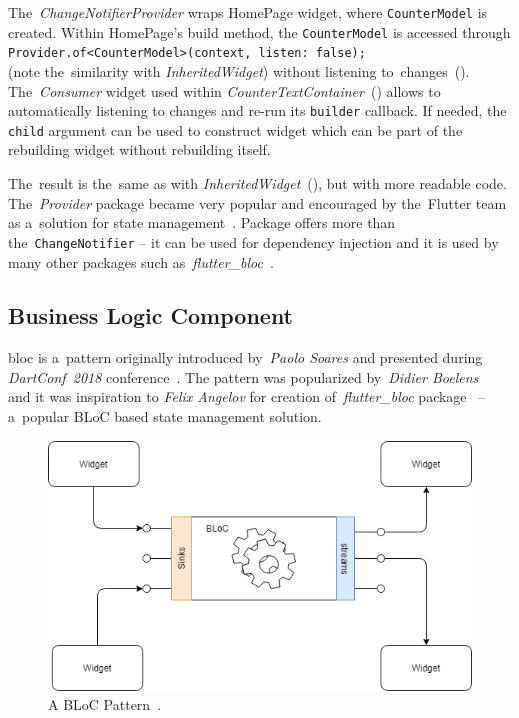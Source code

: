 The~\textit{ChangeNotifierProvider} wraps HomePage widget, where \verb|CounterModel| is created. Within HomePage's build method, the \verb|CounterModel| is accessed through \verb|Provider.of<CounterModel>(context, listen: false);| \\(note the~similarity with \textit{InheritedWidget}) without listening to~changes~(). The~\textit{Consumer} widget used within \textit{CounterTextContainer}~() allows to automatically listening to changes and re-run its \verb|builder| callback. If needed, the \verb|child| argument can be used to construct widget which can be part of the rebuilding widget without rebuilding itself. 

The~result is the~same as with \textit{InheritedWidget}~(), but with more readable code. The~\textit{Provider} package became very popular and encouraged by the~Flutter team as a~solution for state management~\cite{flutter-simple-state-management}. Package offers more than the~\verb|ChangeNotifier| -- it can be used for dependency injection and it is used by many other packages such as~\textit{flutter\_bloc}~\cite{package-bloc}.
\subsection{Business Logic Component}
\gls{bloc} is a~pattern originally introduced by~\textit{Paolo Soares} and presented during \textit{DartConf~2018} conference~\cite{bloc-pattern-youtube}. The pattern was popularized by~\textit{Didier Boelens}~\cite{reactive-didier} and it was inspiration to \textit{Felix Angelov} for creation of~\textit{flutter\_bloc} package~\cite{package-bloc} -- a~popular BLoC based state management solution.

\begin{figure}[ht]
    \centering
    \includegraphics[width=0.75\linewidth]{img/flutter/bloc_pattern.png}
    \caption{A BLoC Pattern~\cite{notion-widget-didier}.}
    \label{fig:bloc-pattern}
\end{figure}

